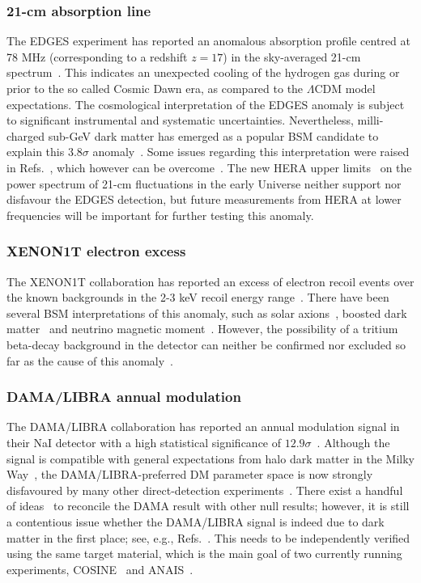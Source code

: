 \documentclass[10pt]{article}
\begin{document}
\subsubsection{21-cm absorption line}
The EDGES experiment has reported an
anomalous absorption profile centred at 78 MHz (corresponding to a  redshift $z=17$) in the sky-averaged
21-cm spectrum~\cite{Bowman:2018yin}. This indicates an unexpected cooling of the hydrogen gas during or prior to the so called Cosmic Dawn era, as compared to the $\Lambda$CDM model expectations. The cosmological interpretation of the EDGES anomaly is subject to significant instrumental and systematic uncertainties. Nevertheless,  milli-charged sub-GeV dark matter has emerged as a popular BSM candidate to explain this $3.8\sigma$ anomaly~\cite{Munoz:2018pzp, Barkana:2018lgd}. Some issues regarding this interpretation were raised in Refs.~\cite{Berlin:2018sjs, Barkana:2018qrx, Slatyer:2018aqg, Boddy:2018wzy}, which however can be overcome~\cite{Liu:2019knx}. The new HERA upper limits~\cite{HERA:2021noe} on the power spectrum of 21-cm fluctuations in the early Universe neither support nor disfavour the  EDGES detection, but future measurements from HERA at lower frequencies will be important for further testing this anomaly. 

\subsubsection{XENON1T electron excess}
The XENON1T collaboration has reported an excess of electron recoil events over the known backgrounds in the 2-3 keV recoil energy range~\cite{XENON:2020rca}. There have been several BSM interpretations of this anomaly, such as solar axions~\cite{Takahashi:2020bpq, DiLuzio:2020jjp, Bell:2020bes, Gao:2020wer, Athron:2020maw}, boosted dark matter~\cite{Kannike:2020agf, Fornal:2020npv} and neutrino magnetic moment~\cite{Miranda:2020kwy, Babu:2020ivd}. However, the possibility of a tritium beta-decay background in the detector can neither be confirmed nor excluded so far as the cause of this anomaly~\cite{XENON:2020rca}. 

\subsubsection{DAMA/LIBRA annual modulation}
The DAMA/LIBRA collaboration has reported an annual modulation signal in their NaI detector with a high statistical significance of  $12.9\sigma$~\cite{Bernabei:2018jrt}. Although the signal is compatible with general expectations from halo dark matter in the Milky Way~\cite{Drukier:1986tm}, the DAMA/LIBRA-preferred DM parameter space is now strongly disfavoured by many other direct-detection experiments~\cite{Billard:2021uyg}. There exist a handful of ideas~\cite{Tucker-Smith:2001myb, Feng:2011vu, Foot:2020ehn} to reconcile the DAMA result with other null results; however, it is still a contentious issue whether the DAMA/LIBRA signal is indeed due to dark matter in the first place; see, e.g., Refs.~\cite{Buttazzo:2020bto, Messina:2020pnt}. This needs to be independently verified using the same target material, which is the main goal of two currently running experiments, COSINE~\cite{Adhikari:2018ljm} and ANAIS~\cite{Amare:2021yyu}. 
\end{document}
